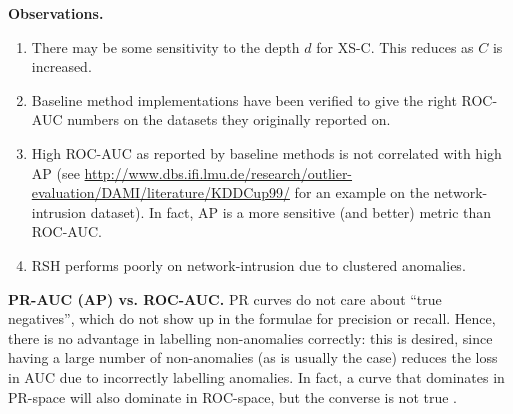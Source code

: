 \documentclass[11pt,onecolumn]{article}
\begin{document}
\textbf{Observations.}
\begin{enumerate}
	\item There may be some sensitivity to the depth $d$ for XS-C. This reduces as $C$ is increased.
	\item Baseline method implementations have been verified to give the right ROC-AUC numbers on the datasets they originally reported on.
	\item High ROC-AUC as reported by baseline methods is not correlated with high AP (see \url{http://www.dbs.ifi.lmu.de/research/outlier-evaluation/DAMI/literature/KDDCup99/} for an example on the network-intrusion dataset). In fact, AP is a more sensitive (and better) metric than ROC-AUC.
	\item RSH performs poorly on network-intrusion due to clustered anomalies.
\end{enumerate}

\textbf{PR-AUC (AP) vs. ROC-AUC.} PR curves do not care about ``true negatives'', which do not show up in the formulae for precision or recall. Hence, there is no advantage in labelling non-anomalies correctly: this is desired, since having a large number of non-anomalies (as is usually the case) reduces the loss in AUC due to incorrectly labelling anomalies. In fact, a curve that dominates in PR-space will also dominate in ROC-space, but the converse is not true \parencite{davis2006relationship}.





\printbibliography
\end{document}
